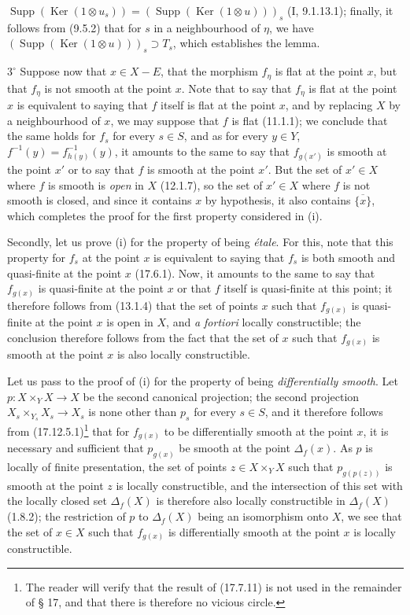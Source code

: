 
$\operatorname{Supp}(\operatorname{Ker}(1\otimes u_s))=(\operatorname{Supp}(\operatorname{Ker}(1\otimes u)))_s$ (I, 9.1.13.1); finally, it follows from (9.5.2) that for $s$ in a neighbourhood of $\eta$, we have $(\operatorname{Supp}(\operatorname{Ker}(1\otimes u)))_s\supset T_s$, which establishes the lemma.

$3^\circ$ Suppose now that $x\in X-E$, that the morphism $f_\eta$ is flat at the point $x$, but that $f_\eta$ is not smooth at the point $x$. Note that to say that $f_\eta$ is flat at the point $x$ is equivalent to saying that $f$ itself is flat at the point $x$, and by replacing $X$ by a neighbourhood of $x$, we may suppose that $f$ is flat (11.1.1); we conclude that the same holds for $f_s$ for every $s\in S$, and as for every $y\in Y$, $f^{-1}(y)=f_{h(y)}^{-1}(y)$, it amounts to the same to say that $f_{g(x')}$ is smooth at the point $x'$ or to say that $f$ is smooth at the point $x'$. But the set of $x'\in X$ where $f$ is smooth is \emph{open} in $X$ (12.1.7), so the set of $x'\in X$ where $f$ is not smooth is closed, and since it contains $x$ by hypothesis, it also contains $\overline{\{x\}}$, which completes the proof for the first property considered in (i).

Secondly, let us prove (i) for the property of being \emph{étale}. For this, note that this property for $f_s$ at the point $x$ is equivalent to saying that $f_s$ is both smooth and quasi-finite at the point $x$ (17.6.1). Now, it amounts to the same to say that $f_{g(x)}$ is quasi-finite at the point $x$ or that $f$ itself is quasi-finite at this point; it therefore follows from (13.1.4) that the set of points $x$ such that $f_{g(x)}$ is quasi-finite at the point $x$ is open in $X$, and \emph{a fortiori} locally constructible; the conclusion therefore follows from the fact that the set of $x$ such that $f_{g(x)}$ is smooth at the point $x$ is also locally constructible.

Let us pass to the proof of (i) for the property of being \emph{differentially smooth}. Let $p:X\times_Y X\to X$ be the second canonical projection; the second projection $X_s\times_{Y_s}X_s\to X_s$ is none other than $p_s$ for every $s\in S$, and it therefore follows from (17.12.5.1)\footnote{The reader will verify that the result of (17.7.11) is not used in the remainder of § 17, and that there is therefore no vicious circle.} that for $f_{g(x)}$ to be differentially smooth at the point $x$, it is necessary and sufficient that $p_{g(x)}$ be smooth at the point $\Delta_f(x)$. As $p$ is locally of finite presentation, the set of points $z\in X\times_Y X$ such that $p_{g(p(z))}$ is smooth at the point $z$ is locally constructible, and the intersection of this set with the locally closed set $\Delta_f(X)$ is therefore also locally constructible in $\Delta_f(X)$ (1.8.2); the restriction of $p$ to $\Delta_f(X)$ being an isomorphism onto $X$, we see that the set of $x\in X$ such that $f_{g(x)}$ is differentially smooth at the point $x$ is locally constructible.

